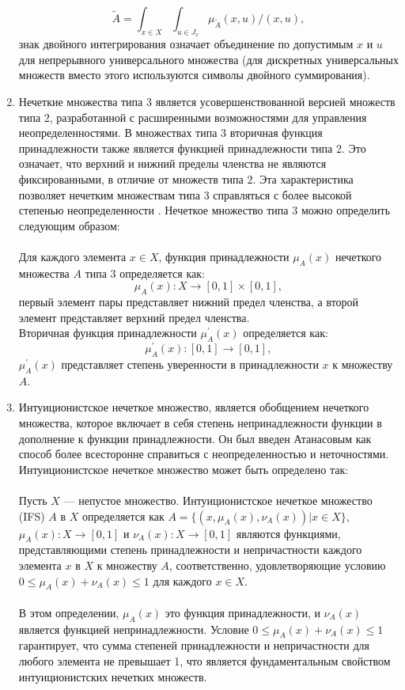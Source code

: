 \documentclass{article}
\begin{document}
\begin{enumerate}
        $$\tilde{A}=\int_{x\in X}\int_{u\in J_{x}} \mu_{\tilde{A}}(x,u) / (x,u),$$
        знак двойного интегрирования означает объединение по допустимым $x$ и $u$ для непрерывного универсального множества (для дискретных универсальных множеств вместо этого используются символы двойного суммирования).
        \item Нечеткие множества типа 3 является усовершенствованной версией множеств типа 2, разработанной с расширенными возможностями для управления неопределенностями. В множествах типа 3 вторичная функция принадлежности также является функцией принадлежности типа 2. Это означает, что верхний и нижний пределы членства не являются фиксированными, в отличие от множеств типа 2. Эта характеристика позволяет нечетким множествам типа 3 справляться с более высокой степенью неопределенности \cite{litlink22}. Нечеткое множество типа 3 можно определить следующим образом:\\
        ~\\
        Для каждого элемента \(x \in X\), функция принадлежности \(\mu_{A}(x)\) нечеткого множества \(A\) типа 3 определяется как:\\
        \[\mu_{A}(x) : X \rightarrow [0,1] \times [0,1],\]
        первый элемент пары представляет нижний предел членства, а второй элемент представляет верхний предел членства.\\
        Вторичная функция принадлежности \(\mu_{A}^{'}(x)\) определяется как:\\
        \[\mu_{A}^{'}(x) : [0,1] \rightarrow [0,1],\]
        \(\mu_{A}^{'}(x)\) представляет степень уверенности в принадлежности \(x\) к множеству \(A\).
        \item Интуиционистское нечеткое множество, является обобщением нечеткого множества, которое включает в себя степень непринадлежности функции в дополнение к функции принадлежности. Он был введен Атанасовым как способ более всесторонне справиться с неопределенностью и неточностями. Интуиционистское нечеткое множество может быть определено так:\\
        ~\\
        Пусть $X$ — непустое множество. Интуиционистское нечеткое множество (IFS) $A$ в $X$ определяется как $A = \{(x, \mu_A(x), \nu_A(x)) | x \in X\}$, $\mu_A(x): X \rightarrow [0,1]$ и $\nu_A(x): X \rightarrow [0,1]$ являются функциями, представляющими степень принадлежности и непричастности каждого элемента $x$ в $X$ к множеству $A$, соответственно, удовлетворяющие условию $0 \leq \mu_A(x) + \nu_A(x) \leq 1$ для каждого $x \in X$.\\
        ~\\
        В этом определении, $\mu_A(x)$ это функция принадлежности, и $\nu_A(x)$ является функцией непринадлежности. Условие $0 \leq \mu_A(x) + \nu_A(x) \leq 1$ гарантирует, что сумма степеней принадлежности и непричастности для любого элемента не превышает 1, что является фундаментальным свойством интуиционистских нечетких множеств.\\
    \end{enumerate}
\end{document}
